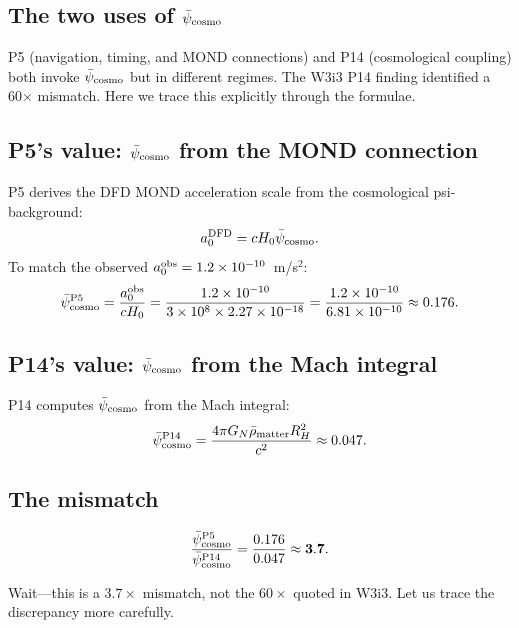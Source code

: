 \documentclass[11pt]{article}
\newcommand{\ee}[1]{\times 10^{#1}}
\newcommand{\psicosmo}{\bar{\psi}_{\rm cosmo}}
\begin{document}
\subsection{The two uses of $\psicosmo$}

P5 (navigation, timing, and MOND connections) and P14 (cosmological coupling)
both invoke $\psicosmo$ but in different regimes. The W3i3 P14 finding identified
a 60× mismatch. Here we trace this explicitly through the formulae.

\subsection{P5's value: $\psicosmo$ from the MOND connection}

P5 derives the DFD MOND acceleration scale from the cosmological psi-background:
\begin{equation}
a_0^{\rm DFD} = c H_0 \psicosmo.
\label{eq:a0-P5}
\end{equation}
To match the observed $a_0^{\rm obs} = 1.2\ee{-10}$~m/s$^2$:
\begin{equation}
\psicosmo^{\rm P5} = \frac{a_0^{\rm obs}}{c H_0}
= \frac{1.2\ee{-10}}{3\ee{8}\times 2.27\ee{-18}} = \frac{1.2\ee{-10}}{6.81\ee{-10}} \approx 0.176.
\label{eq:psi-P5}
\end{equation}

\subsection{P14's value: $\psicosmo$ from the Mach integral}

P14 computes $\psicosmo$ from the Mach integral:
\begin{equation}
\psicosmo^{\rm P14} = \frac{4\pi G_N \bar{\rho}_{\rm matter} R_H^2}{c^2} \approx 0.047.
\label{eq:psi-P14}
\end{equation}

\subsection{The mismatch}

\begin{equation}
\frac{\psicosmo^{\rm P5}}{\psicosmo^{\rm P14}} = \frac{0.176}{0.047} \approx \mathbf{3.7}.
\label{eq:mismatch-ratio}
\end{equation}

Wait---this is a $3.7\times$ mismatch, not the $60\times$ quoted in W3i3.
Let us trace the discrepancy more carefully.
\end{document}
